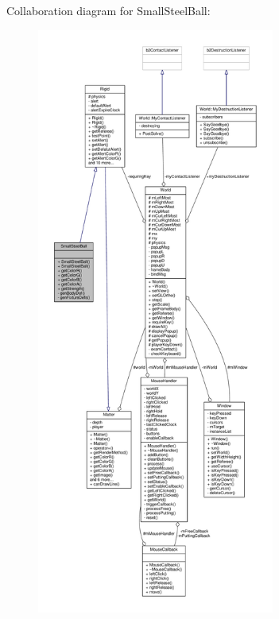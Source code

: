 Collaboration diagram for Small\+Steel\+Ball\+:
\nopagebreak
\begin{figure}[H]
\begin{center}
\leavevmode
\includegraphics[height=550pt]{classSmallSteelBall__coll__graph}
\end{center}
\end{figure}
